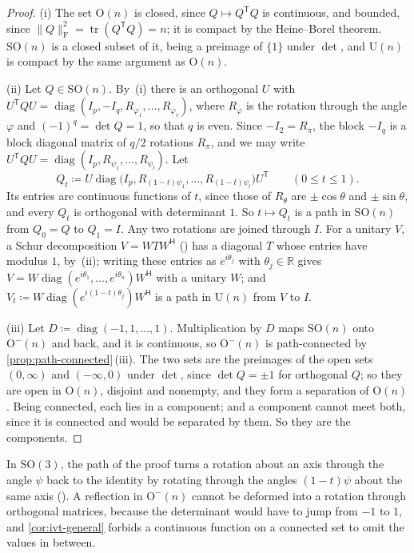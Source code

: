 \begin{proof}
(i) The set $\mathrm O(n)$ is closed, since $Q\mapsto Q^{\mathsf T}Q$ is continuous, and bounded, since $\|Q\|_{\mathrm F}^2=\operatorname{tr}(Q^{\mathsf T}Q)=n$; it is compact by the Heine--Borel theorem. $\mathrm{SO}(n)$ is a closed subset of it, being a preimage of $\{1\}$ under $\det$, and $\mathrm U(n)$ is compact by the same argument as $\mathrm O(n)$.

(ii) Let $Q\in\mathrm{SO}(n)$. By \,(i) there is an orthogonal $U$ with $U^{\mathsf T}QU=\operatorname{diag}(I_p,-I_q,R_{\varphi_1},\ldots,R_{\varphi_s})$, where $R_\varphi$ is the rotation through the angle $\varphi$ and $(-1)^q=\det Q=1$, so that $q$ is even. Since $-I_2=R_\pi$, the block $-I_q$ is a block diagonal matrix of $q/2$ rotations $R_\pi$, and we may write $U^{\mathsf T}QU=\operatorname{diag}(I_p,R_{\psi_1},\ldots,R_{\psi_l})$. Let
\[
Q_t\coloneqq U\operatorname{diag}\bigl(I_p,R_{(1-t)\psi_1},\ldots,R_{(1-t)\psi_l}\bigr)U^{\mathsf T}\qquad(0\le t\le1).
\]
Its entries are continuous functions of $t$, since those of $R_\theta$ are $\pm\cos\theta$ and $\pm\sin\theta$, and every $Q_t$ is orthogonal with determinant $1$. So $t\mapsto Q_t$ is a path in $\mathrm{SO}(n)$ from $Q_0=Q$ to $Q_1=I$. Any two rotations are joined through $I$. For a unitary $V$, a Schur decomposition $V=WTW^{\mathsf H}$ () has a diagonal $T$ whose entries have modulus $1$, by \,(ii); writing these entries as $e^{i\theta_j}$ with $\theta_j\in\mathbb R$ gives $V=W\operatorname{diag}(e^{i\theta_1},\ldots,e^{i\theta_n})W^{\mathsf H}$ with a unitary $W$; and $V_t\coloneqq W\operatorname{diag}(e^{i(1-t)\theta_j})W^{\mathsf H}$ is a path in $\mathrm U(n)$ from $V$ to $I$.

(iii) Let $D\coloneqq\operatorname{diag}(-1,1,\ldots,1)$. Multiplication by $D$ maps $\mathrm{SO}(n)$ onto $\mathrm O^-(n)$ and back, and it is continuous, so $\mathrm O^-(n)$ is path-connected by \cref{prop:path-connected}\,(iii). The two sets are the preimages of the open sets $(0,\infty)$ and $(-\infty,0)$ under $\det$, since $\det Q=\pm1$ for orthogonal $Q$; so they are open in $\mathrm O(n)$, disjoint and nonempty, and they form a separation of $\mathrm O(n)$. Being connected, each lies in a component; and a component cannot meet both, since it is connected and would be separated by them. So they are the components.
\end{proof}

In $\mathrm{SO}(3)$, the path of the proof turns a rotation about an axis through the angle $\psi$ back to the identity by rotating through the angles $(1-t)\psi$ about the same axis (). A reflection in $\mathrm O^-(n)$ cannot be deformed into a rotation through orthogonal matrices, because the determinant would have to jump from $-1$ to $1$, and \cref{cor:ivt-general} forbids a continuous function on a connected set to omit the values in between.

